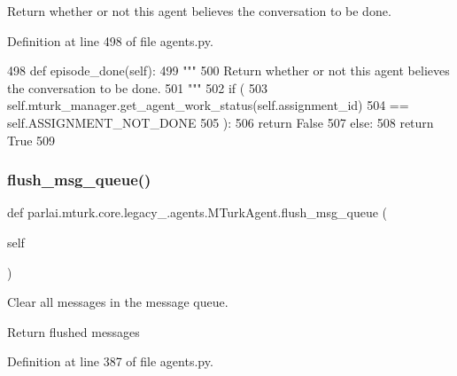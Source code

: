 \begin{DoxyVerb}Return whether or not this agent believes the conversation to be done.
\end{DoxyVerb}
 

Definition at line 498 of file agents.\+py.


\begin{DoxyCode}
498     \textcolor{keyword}{def }episode\_done(self):
499         \textcolor{stringliteral}{"""}
500 \textcolor{stringliteral}{        Return whether or not this agent believes the conversation to be done.}
501 \textcolor{stringliteral}{        """}
502         \textcolor{keywordflow}{if} (
503             self.mturk\_manager.get\_agent\_work\_status(self.assignment\_id)
504             == self.ASSIGNMENT\_NOT\_DONE
505         ):
506             \textcolor{keywordflow}{return} \textcolor{keyword}{False}
507         \textcolor{keywordflow}{else}:
508             \textcolor{keywordflow}{return} \textcolor{keyword}{True}
509 
\end{DoxyCode}
\mbox{\label{classparlai_1_1mturk_1_1core_1_1legacy__2018_1_1agents_1_1MTurkAgent_a209329c54335277c0998a9185cdfc1d7}} 
\subsubsection{\texorpdfstring{flush\+\_\+msg\+\_\+queue()}{flush\_msg\_queue()}}
{\footnotesize\ttfamily def parlai.\+mturk.\+core.\+legacy\+\_.\+agents.\+M\+Turk\+Agent.\+flush\+\_\+msg\+\_\+queue (\begin{DoxyParamCaption}\item[{}]{self }\end{DoxyParamCaption})}

\begin{DoxyVerb}Clear all messages in the message queue.

Return flushed messages
\end{DoxyVerb}
 

Definition at line 387 of file agents.\+py.


